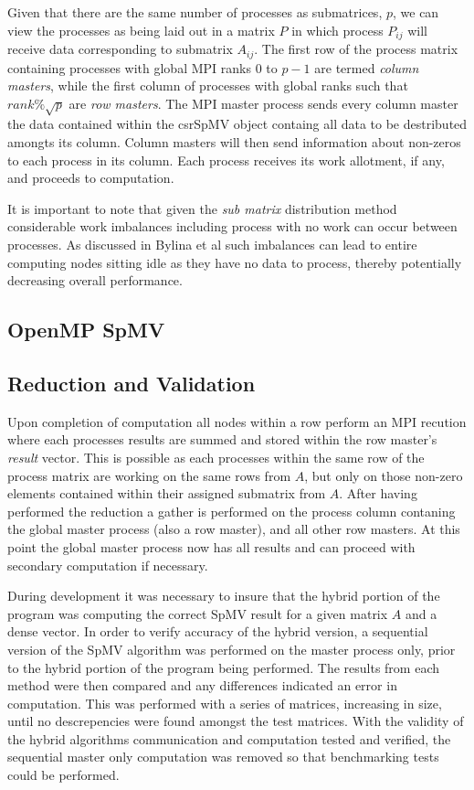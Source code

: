 Given that there are the same number of processes as submatrices, $p$, we can view the processes as being laid out in a matrix $P$ in which process $P_{ij}$ will receive data corresponding to submatrix $A_{ij}$.
The first row of the process matrix containing processes with global MPI ranks $0$ to $p-1$ are termed \emph{column masters}, while the first column of processes with global ranks such that $rank \% \sqrt{p} $ are \emph{row masters}.
The MPI master process sends every column master the data contained within the csrSpMV object containg all data to be destributed amongts its column.
Column masters will then send information about non-zeros to each process in its column.
Each process receives its work allotment, if any, and proceeds to computation.

It is important to note that given the \emph{sub matrix} distribution method considerable work imbalances including process with no work can occur between processes. As discussed in Bylina et al such imbalances can lead to entire computing nodes sitting idle as they have no data to process, thereby potentially decreasing overall performance. 

\subsection{OpenMP SpMV}


\subsection{Reduction and Validation}

Upon completion of computation all nodes within a row perform an MPI recution where each processes results are summed and stored within the row master's \emph{result} vector.
This is possible as each processes within the same row of the process matrix are working on the same rows from $A$, but only on those non-zero elements contained within their assigned submatrix from $A$. 
After having performed the reduction a gather is performed on the process column contaning the global master process (also a row master), and all other row masters.
At this point the global master process now has all results and can proceed with secondary computation if necessary. 

During development it was necessary to insure that the hybrid portion of the program was computing the correct SpMV result for a given matrix $A$ and a dense vector.
In order to verify accuracy of the hybrid version, a sequential version of the SpMV algorithm was performed on the master process only, prior to the hybrid portion of the program being performed.
The results from each method were then compared and any differences indicated an error in computation.
This was performed with a series of matrices, increasing in size, until no descrepencies were found amongst the test matrices. 
With the validity of the hybrid algorithms communication and computation tested and verified, the sequential master only computation was removed so that benchmarking tests could be performed. 

